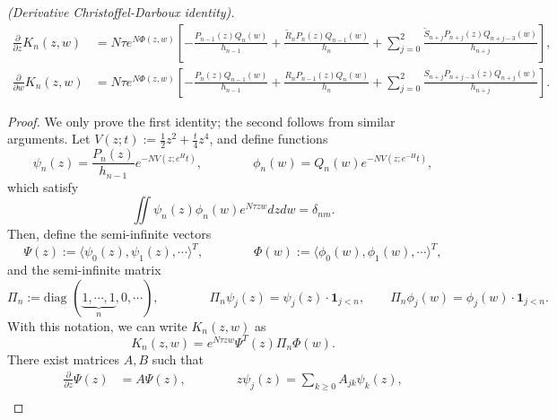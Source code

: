 \documentclass[10pt,a4paper]{amsart}
\begin{document}
\begin{lemma}\label{CD-lemma} \textit{(Derivative Christoffel-Darboux identity).}
    \begin{align*}
        \frac{\partial}{\partial z} K_n(z,w) &= N\tau e^{N\Phi(z,w)}\left[-\frac{P_{n-1}(z)Q_n(w)}{h_{n-1}} + \frac{\tilde{R}_nP_n(z)Q_{n-1}(w)}{h_n} + \sum_{j=0}^{2}\frac{\tilde{S}_{n+j}P_{n+j}(z)Q_{n+j-3}(w)}{h_{n+j}} \right],\\
        \frac{\partial}{\partial w} K_n(z,w) &=N\tau e^{N\Phi(z,w)}\left[-\frac{P_n(z)Q_{n-1}(w)}{h_{n-1}} + \frac{R_nP_{n-1}(z)Q_n(w)}{h_n} + \sum_{j=0}^{2}\frac{S_{n+j}P_{n+j-3}(z)Q_{n+j}(w)}{h_{n+j}} \right].
    \end{align*}
\end{lemma}

\begin{proof}
    We only prove the first identity; the second follows from similar arguments. Let $V(z;t):=\frac{1}{2}z^2+\frac{t}{4}z^4$,
    and define functions
        \begin{equation}
            \psi_n(z) = \frac{P_n(z)}{h_{n-1}}e^{-NV(z;e^{H}t)},\qquad\qquad \phi_n(w) = Q_n(w)e^{-NV(z;e^{-H}t)},
        \end{equation}
    which satisfy 
        \begin{equation}
            \iint \psi_n(z) \phi_n(w)e^{N\tau zw} dzdw = \delta_{nm}.
        \end{equation}
    Then, define the semi-infinite vectors
    \begin{equation}
        \Psi(z) := \langle \psi_0(z),\psi_1(z),\cdots \rangle^T,\qquad\qquad \Phi(w) := \langle \phi_0(w),\phi_1(w),\cdots \rangle^T,
    \end{equation}
and the semi-infinite matrix
    \begin{equation}
        \Pi_n:=\text{diag }(\underbrace{1,\cdots,1}_{n},0,\cdots), \qquad\qquad \Pi_n \psi_j(z) = \psi_j(z) \cdot \boldsymbol{1}_{j<n},
        \qquad \Pi_n \phi_j(w) = \phi_j(w) \cdot \boldsymbol{1}_{j<n}.
    \end{equation}
With this notation, we can write $K_n(z,w)$ as
    \begin{equation*}
        K_n(z,w) = e^{N\tau zw} \Psi^T(z)\Pi_n\Phi(w).
    \end{equation*}
There exist matrices $A,B$ such that
    \begin{align*}
        \frac{\partial}{\partial z}\Psi(z) &= A\Psi(z),\qquad\qquad z\psi_j(z) = \sum_{k\geq 0} A_{jk}\psi_k(z),\\

\end{align*}
\end{proof}
\end{document}
